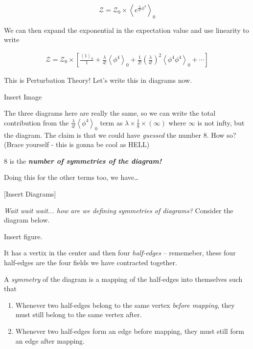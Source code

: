 \documentclass{article}
\newcommand{\cZ}{\mathcal{Z}}
\newcommand{\mean}[1]{\left\langle #1 \right\rangle}
\begin{document}
\[\cZ = \cZ_0 \times  \mean{e^{\frac{\lambda}{4!} \phi^4}}_0  \]

We can then expand the exponential in the expectation value and use linearity to write 

\begin{align*}
  \cZ = \cZ_0 \times \left[\frac{\mean{1}_0}{1} + \frac{\lambda}{4!}\mean{\phi^4}_0 + \frac{1}{2!} \left(\frac{\lambda}{4!}\right)^2 \mean{\phi^4 \phi^4}_0 + \cdots \right]
\end{align*}

This is Perturbation Theory! Let's write this in diagrams now. 

\vskip 0.25cm
Insert Image

\vskip 0.25cm
The three diagrams here are really the same, so we can write the total contribution from the $\frac{\lambda}{4!}\mean{\phi^4}_0$ term as $\lambda \times \frac{1}{8} \times \left(\infty\right)$ where $\infty$ is not infty, but the diagram. The claim is that we could have \emph{guessed} the number $8$. How so? (Brace yourself - this is gonna be cool as HELL)

\vskip 0.5cm
\begin{mathdefinitionbox}{}
  \begin{center}
  $8$ is the \emph{\textbf{number of symmetries of the diagram!}}
  \end{center}
\end{mathdefinitionbox}

Doing this for the other terms too, we have\dots

\vskip 0.5cm
[Insert Diagrams]

\vskip 1cm
\begin{dottedbox}
  \emph{Wait wait wait... how are we defining symmetries of diagrams?} Consider the diagram below.
  
  \vskip 0.25cm
  Insert figure.

  \vskip 0.25cm
  It has a vertix in the center and then four \emph{half-edges} -- rememeber, these four half-edges are the four fields we have contracted together.

  \vskip 0.25cm
  A \emph{symmetry} of the diagram is a mapping of the half-edges into themselves such that 
  \begin{enumerate}
    \item Whenever two half-edges belong to the same vertex \emph{before mapping}, they must still belong to the same vertex after.
    \item Whenever two half-edges form an edge before mapping, they must still form an edge after mapping.
  \end{enumerate}
\end{dottedbox}
\end{document}
